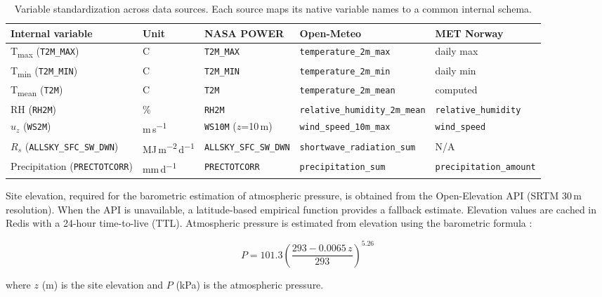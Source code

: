 \documentclass[preprint,review,12pt]{elsarticle}
\begin{document}
\begin{table}[htbp]
\centering
\caption{Variable standardization across data sources. Each source maps its
native variable names to a common internal schema.}
\label{tab:variables}
\small
\begin{tabular}{@{}lllll@{}}
\toprule
Internal variable & Unit & NASA POWER & Open-Meteo & MET Norway \\
\midrule
T\textsubscript{max} (\texttt{T2M\_MAX}) & \textdegree{}C & \texttt{T2M\_MAX} & \texttt{temperature\_2m\_max} & daily max \\
T\textsubscript{min} (\texttt{T2M\_MIN}) & \textdegree{}C & \texttt{T2M\_MIN} & \texttt{temperature\_2m\_min} & daily min \\
T\textsubscript{mean} (\texttt{T2M}) & \textdegree{}C & \texttt{T2M} & \texttt{temperature\_2m\_mean} & computed \\
RH (\texttt{RH2M}) & \% & \texttt{RH2M} & \texttt{relative\_humidity\_2m\_mean} & \texttt{relative\_humidity} \\
$u_z$ (\texttt{WS2M}) & m\,s\textsuperscript{$-1$} & \texttt{WS10M} ($z$=10\,m) & \texttt{wind\_speed\_10m\_max} & \texttt{wind\_speed} \\
$R_s$ (\texttt{ALLSKY\_SFC\_SW\_DWN}) & MJ\,m\textsuperscript{$-2$}\,d\textsuperscript{$-1$} & \texttt{ALLSKY\_SFC\_SW\_DWN} & \texttt{shortwave\_radiation\_sum} & N/A \\
Precipitation (\texttt{PRECTOTCORR}) & mm\,d\textsuperscript{$-1$} & \texttt{PRECTOTCORR} & \texttt{precipitation\_sum} & \texttt{precipitation\_amount} \\
\bottomrule
\end{tabular}
\end{table}

Site elevation, required for the barometric estimation of atmospheric pressure,
is obtained from the Open-Elevation API (SRTM 30\,m resolution). When the API
is unavailable, a latitude-based empirical function provides a fallback
estimate. Elevation values are cached in Redis with a 24-hour time-to-live
(TTL). Atmospheric pressure is estimated from elevation using the barometric
formula \citep{Allen1998}:

\begin{equation}
P = 101.3 \left(\frac{293 - 0.0065\,z}{293}\right)^{5.26}
\label{eq:pressure}
\end{equation}

\noindent where $z$ (m) is the site elevation and $P$ (kPa) is the atmospheric
pressure.
\end{document}
